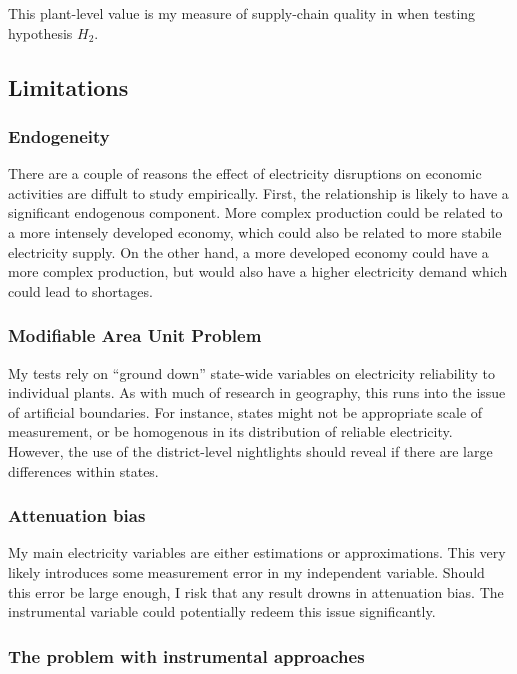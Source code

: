 \documentclass[11pt]{article}
\begin{document}
This plant-level value is my measure of supply-chain quality in when testing hypothesis \(H_2\).

\subsection{Limitations}
\label{sec:org979560b}

\subsubsection{Endogeneity}
\label{sec:orgd4457e7}
There are a couple of reasons the effect of electricity disruptions on economic activities are diffult to study empirically. First, the relationship is likely to have a significant endogenous component. More complex production could be related to a more intensely developed economy, which could also be related to more stabile electricity supply. On the other hand, a more developed economy could have a more complex production, but would also have a higher electricity demand which could lead to shortages.

\subsubsection{Modifiable Area Unit Problem}
\label{sec:org4e3cc26}
My tests rely on ``ground down'' state-wide variables on electricity reliability to individual plants. As with much of research in geography, this runs into the issue of artificial boundaries. For instance, states might not be appropriate scale of measurement, or be homogenous in its distribution of reliable electricity. However, the use of the district-level nightlights should reveal if there are large differences within states.

\subsubsection{Attenuation bias}
\label{sec:orge917ac0}
My main electricity variables are either estimations or approximations. This very likely introduces some measurement error in my independent variable. Should this error be large enough, I risk that any result drowns in attenuation bias. The instrumental variable could potentially redeem this issue significantly.

\subsubsection{The problem with instrumental approaches}
\label{sec:orge917ac0}
\end{document}
